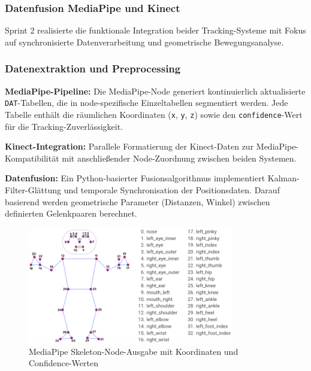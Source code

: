 \subsubsection{Datenfusion MediaPipe und Kinect}

Sprint 2 realisierte die funktionale Integration beider Tracking-Systeme mit Fokus auf synchronisierte Datenverarbeitung und geometrische Bewegungsanalyse.

\subsubsection{Datenextraktion und Preprocessing}

\textbf{MediaPipe-Pipeline:}
Die MediaPipe-Node generiert kontinuierlich aktualisierte \texttt{DAT}-Tabellen, die in node-spezifische Einzeltabellen segmentiert werden. Jede Tabelle enthält die räumlichen Koordinaten (\texttt{x}, \texttt{y}, \texttt{z}) sowie den \texttt{confidence}-Wert für die Tracking-Zuverlässigkeit.

\textbf{Kinect-Integration:}
Parallele Formatierung der Kinect-Daten zur MediaPipe-Kompatibilität mit anschließender Node-Zuordnung zwischen beiden Systemen.

\textbf{Datenfusion:}
Ein Python-basierter Fusionsalgorithmus implementiert Kalman-Filter-Glättung und temporale Synchronisation der Positionsdaten. Darauf basierend werden geometrische Parameter (Distanzen, Winkel) zwischen definierten Gelenkpaaren berechnet.

\begin{figure}[H]
    \centering
    \includegraphics[width=0.8\textwidth]{images/mediapipeNODES.png}
    \caption{MediaPipe Skeleton-Node-Ausgabe mit Koordinaten und Confidence-Werten}
    \label{fig:mediapipe_nodes}
\end{figure}

